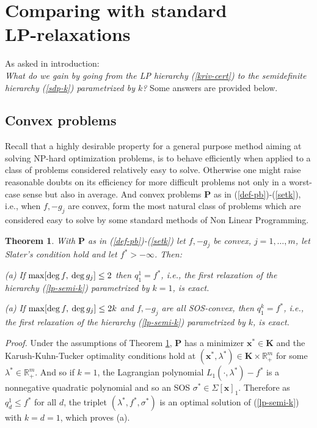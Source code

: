 \documentclass[11pt]{article}
\newtheorem{theorem}{Theorem}[section]
\numberwithin{equation}{section}
\def\x{\mathbf{x}}
\def\R{\mathbb{R}}
\def\K{\mathbf{K}}
\def\P{\mathbf{P}}
\begin{document}
 
 \section{Comparing with standard \\LP-relaxations}
 
 As asked in introduction:\\ {\it What do we gain by going from the LP hierarchy (\ref{kriv-cert}) to the 
 semidefinite hierarchy (\ref{sdp-k}) parametrized by $k$?}
 Some answers are provided below.
 
 
 
 \subsection{Convex problems}
 
 Recall that a highly desirable property for a general purpose method 
aiming at solving NP-hard optimization problems, is to behave efficiently when 
applied to a class of problems considered relatively easy to solve. Otherwise one might raise reasonable doubts on  its
efficiency for more difficult problems not only in a worst-case sense but also in average. And convex problems $\P$ as in (\ref{def-pb})-(\ref{setk}), i.e., when $f,-g_j$ are convex,
form the most natural class of problems which are considered easy to solve by some standard methods of Non Linear Programming.

 
 \begin{theorem}
 \label{th-final}
With $\P$ as in (\ref{def-pb})-(\ref{setk}) let $f,-g_j$ be convex, $j=1,\ldots,m$, let Slater's condition hold and let $f^*>-\infty$.
Then:

(a) If $\max[{\rm deg}\,f,\:{\rm deg}\,g_j]\leq 2$ then $q^1_1=f^*$, i.e., the first relaxation of the hierarchy 
(\ref{lp-semi-k}) parametrized by $k=1$, is exact.

(a) If $\max[{\rm deg}\,f,\:{\rm deg}\,g_j]\leq 2k$ and $f,-g_j$ are all SOS-convex, then $q^k_1=f^*$, i.e., the first relaxation of the hierarchy 
(\ref{lp-semi-k}) parametrized by $k$, is exact.
 \end{theorem}
 {\it Proof.}
 Under the assumptions of Theorem \ref{th-final}, $\P$ has 
 a minimizer $\x^*\in\K$ and the Karush-Kuhn-Tucker optimality conditions hold
 at  $(\x^*,\lambda^*)\in\K\times\R^m_+$ for some $\lambda^*\in\R^m_+$.
 And so if $k=1$, the Lagrangian polynomial  $L_1(\cdot,\lambda^*)-f^*$ is a nonnegative quadratic polynomial
 and so an SOS $\sigma^*\in\Sigma[\x]_1$. Therefore
 as $q^1_d\leq f^*$ for all $d$,  the triplet $(\lambda^*,f^*,\sigma^*)$ is an optimal solution of (\ref{lp-semi-k}) with $k=d=1$, which proves (a).
 
\end{document}
